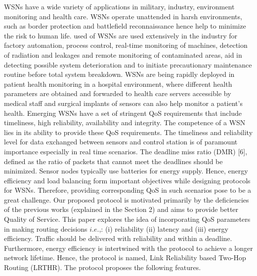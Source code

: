 \documentclass[fleqn,twoside]{article}
\begin{document}
\vskip 2mm
WSNs have a wide variety of applications in military, industry, environment monitoring and health care. WSNs operate unattended
in harsh environments, such as border protection and battlefield reconnaissance hence help to minimize the risk to human life.  used of WSNs are used extensively in the industry for factory automation, process control, real-time monitoring of machines, detection of radiation and leakages and remote monitoring of contaminated areas, aid in detecting possible system deterioration and to initiate precautionary maintenance routine before total system breakdown. WSNs are being rapidly deployed in patient health monitoring in a hospital environment, where different health parameters are obtained and forwarded to health care servers accessible by medical staff and surgical implants of sensors can also help monitor a patient’s health. 
\vskip 2mm
Emerging WSNs have a set of stringent QoS requirements that include timeliness, high reliability, availability and integrity. The competence of a WSN lies in its ability to provide these QoS requirements. The timeliness and reliability level for data exchanged between sensors and control station is of paramount importance especially in real time scenarios. The deadline miss ratio (DMR) [6], defined as the ratio of packets that cannot meet the deadlines should be minimized. Sensor nodes typically use batteries for energy supply. Hence, energy efficiency and load balancing form important objectives while designing protocols for WSNs. Therefore, providing corresponding QoS in such scenarios pose to be a great challenge. Our proposed protocol is motivated primarily by the deficiencies of the previous works (explained in the Section 2) and aims to provide better Quality of Service.
\vskip 2mm
This paper explores the idea of incorporating QoS parameters in making routing decisions $i.e.$,: (i) reliability  (ii) latency and (iii) energy efficiency. Traffic should be delivered with reliability and within a deadline. Furthermore, energy efficiency is intertwined with the protocol to achieve a longer network lifetime. Hence, the protocol is named, Link Reliability based Two-Hop Routing (LRTHR). The protocol proposes the following features.
\end{document}
